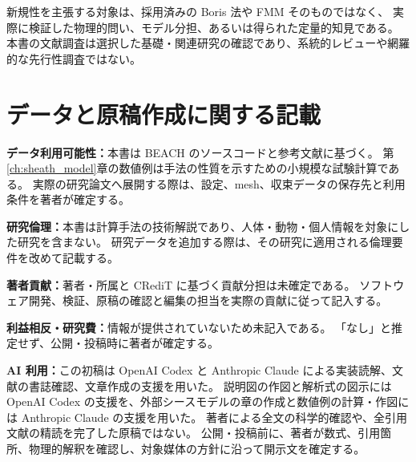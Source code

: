 新規性を主張する対象は、採用済みの Boris 法や FMM そのものではなく、
実際に検証した物理的問い、モデル分担、あるいは得られた定量的知見である。
本書の文献調査は選択した基礎・関連研究の確認であり、系統的レビューや網羅的な先行性調査ではない。

\section{データと原稿作成に関する記載}
\textbf{データ利用可能性：}本書は BEACH のソースコードと参考文献に基づく。
第\ref{ch:sheath_model}章の数値例は手法の性質を示すための小規模な試験計算である。
実際の研究論文へ展開する際は、設定、mesh、収束データの保存先と利用条件を著者が確定する。

\textbf{研究倫理：}本書は計算手法の技術解説であり、人体・動物・個人情報を対象にした研究を含まない。
研究データを追加する際は、その研究に適用される倫理要件を改めて記載する。

\textbf{著者貢献：}著者・所属と CRediT に基づく貢献分担は未確定である。
ソフトウェア開発、検証、原稿の確認と編集の担当を実際の貢献に従って記入する。

\textbf{利益相反・研究費：}情報が提供されていないため未記入である。
「なし」と推定せず、公開・投稿時に著者が確定する。

\textbf{AI 利用：}この初稿は OpenAI Codex と Anthropic Claude による実装読解、文献の書誌確認、文章作成の支援を用いた。
説明図の作図と解析式の図示には OpenAI Codex の支援を、外部シースモデルの章の作成と数値例の計算・作図には Anthropic Claude の支援を用いた。
著者による全文の科学的確認や、全引用文献の精読を完了した原稿ではない。
公開・投稿前に、著者が数式、引用箇所、物理的解釈を確認し、対象媒体の方針に沿って開示文を確定する。
